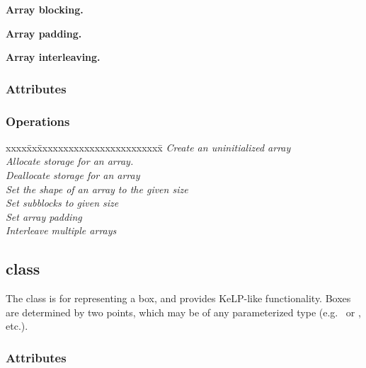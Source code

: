 \documentclass{article}
\begin{document}
\textbf{Array blocking.}

\textbf{Array padding.}

\textbf{Array interleaving.}


\subsubsection{Attributes}

\subsubsection{Operations}


\begin{tabbing}
xxxx\=xx\=xxxxxxxxxxxxxxxxxxxxxxxx\= \kill
\> \todo \>  \> \textit{Create an uninitialized array} \\
\> \todo \>  \> \textit{Allocate storage for an array.} \\
\> \todo \>  \> \textit{Deallocate storage for an array} \\
\> \todo \>   \> \textit{Set the shape of an array to the given size} \\
\> \todo \>   \> \textit{Set subblocks to given size} \\
\> \todo \>   \> \textit{Set array padding} \\
\> \todo \>   \> \textit{Interleave multiple arrays} \\
\end{tabbing}


\subsection{ class}

The  class is for representing a box, and provides KeLP-like functionality.
Boxes are determined by two points, which may be of any parameterized type
(e.g.~ or , etc.).


\subsubsection{Attributes}
\end{document}
